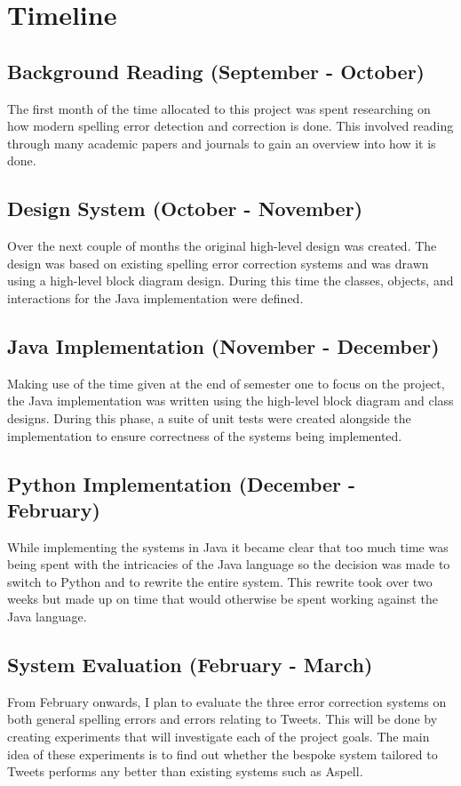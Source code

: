 \chapter{Timeline}

\section{Background Reading (September - October)}
The first month of the time allocated to this project was spent researching on how modern spelling error detection and correction is done. This involved reading through many academic papers and journals to gain an overview into how it is done.

\section{Design System (October - November)}
Over the next couple of months the original high-level design was created. The design was based on existing spelling error correction systems and was drawn using a high-level block diagram design. During this time the classes, objects, and interactions for the Java implementation were defined.

\section{Java Implementation (November - December)}
Making use of the time given at the end of semester one to focus on the project, the Java implementation was written using the high-level block diagram and class designs. During this phase, a suite of unit tests were created alongside the implementation to ensure correctness of the systems being implemented.

\section{Python Implementation (December - February)}
While implementing the systems in Java it became clear that too much time was being spent with the intricacies of the Java language so the decision was made to switch to Python and to rewrite the entire system. This rewrite took over two weeks but made up on time that would otherwise be spent working against the Java language.

\section{System Evaluation (February - March)}
From February onwards, I plan to evaluate the three error correction systems on both general spelling errors and errors relating to Tweets. This will be done by creating experiments that will investigate each of the project goals. The main idea of these experiments is to find out whether the bespoke system tailored to Tweets performs any better than existing systems such as Aspell.

